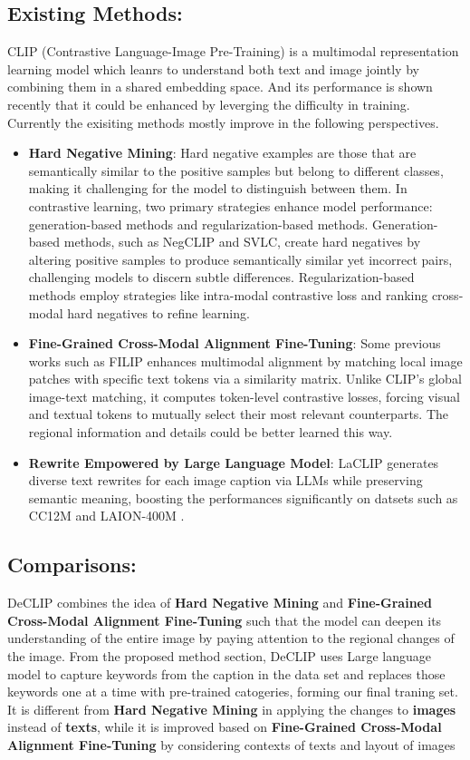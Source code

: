 \documentclass[11pt,letterpaper]{article}
\begin{document}
\subsection{Existing Methods:}
CLIP (Contrastive Language-Image Pre-Training) is a multimodal representation learning model which leanrs to understand both text and image jointly by combining them in a shared embedding space. And its performance is shown recently that it could be enhanced by leverging the difficulty in training.\\
Currently the exisiting methods mostly improve in the following perspectives.\\
\begin{itemize}
    \item \textbf{Hard Negative Mining}: Hard negative examples are those that are semantically similar to the positive samples but belong to different classes, making it challenging for the model to distinguish between them. In contrastive learning, two primary strategies enhance model performance: generation-based methods and regularization-based methods. Generation-based methods, such as NegCLIP and SVLC, create hard negatives by altering positive samples to produce semantically similar yet incorrect pairs, challenging models to discern subtle differences. Regularization-based methods employ strategies like intra-modal contrastive loss and ranking cross-modal hard negatives to refine learning.
    \item \textbf{Fine-Grained Cross-Modal Alignment Fine-Tuning}: Some previous works such as FILIP enhances multimodal alignment by matching local image patches with specific text tokens via a similarity matrix. Unlike CLIP’s global image-text matching, it computes token-level contrastive losses, forcing visual and textual tokens to mutually select their most relevant counterparts. The regional information and details could be better learned this way.
    \item \textbf{Rewrite Empowered by Large Language Model}: LaCLIP generates diverse text rewrites for each image caption via LLMs while preserving semantic meaning, boosting the performances significantly on datsets such as  CC12M and LAION-400M . 
\end{itemize}
\subsection{Comparisons:}
DeCLIP combines the idea of \textbf{Hard Negative Mining} and \textbf{Fine-Grained Cross-Modal Alignment Fine-Tuning} such that the model can deepen its understanding of the entire image by paying attention to the regional changes of the image. From the proposed method section, DeCLIP uses Large language model to capture keywords from the caption in the data set and replaces those keywords one at a time with pre-trained catogeries, forming our final traning set. It is different from \textbf{Hard Negative Mining} in applying the changes to \textbf{images} instead of \textbf{texts}, while it is improved based on \textbf{Fine-Grained Cross-Modal Alignment Fine-Tuning} by considering contexts of texts and layout of images
\end{document}
